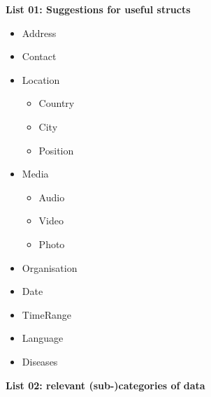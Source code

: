 \documentclass[12pt,english,a4paper,titlepage,cleardoublepage=empty,dottedtoc]{report}
\providecommand{\tightlist}{%
  \setlength{\itemsep}{0pt}\setlength{\parskip}{0pt}}
\begin{document}
\textbf{\protect\hypertarget{list-01_suggested-structs}{}{List 01:
Suggestions for useful structs}}

\begin{itemize}
\tightlist
\item
  Address
\item
  Contact
\item
  Location

  \begin{itemize}
  \tightlist
  \item
    Country
  \item
    City
  \item
    Position
  \end{itemize}
\item
  Media

  \begin{itemize}
  \tightlist
  \item
    Audio
  \item
    Video
  \item
    Photo
  \end{itemize}
\item
  Organisation
\item
  Date
\item
  TimeRange
\item
  Language
\item
  Diseases
\end{itemize}

\textbf{\protect\hypertarget{list-02_data-categories}{}{List 02:
relevant (sub-)categories of data}}
\end{document}
